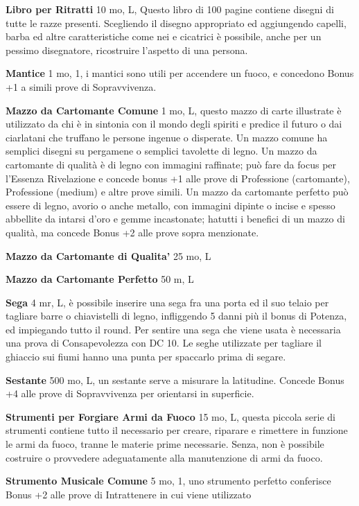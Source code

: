 \documentclass[a4paper,11pt,twoside,openany]{book}
\begin{document}
\textbf{Libro per Ritratti} 10 mo, L,  Questo libro di 100 pagine contiene disegni di tutte le razze presenti. Scegliendo il disegno appropriato ed aggiungendo capelli, barba ed altre caratteristiche come nei e cicatrici è possibile, anche per un pessimo disegnatore, ricostruire l'aspetto di una persona.

\textbf{Mantice} 1 mo, 1, i mantici sono utili per accendere un fuoco, e concedono Bonus +1 a simili prove di Sopravvivenza.

\textbf{Mazzo da Cartomante Comune} 1 mo, L, questo mazzo di carte illustrate è utilizzato da chi è in sintonia con il mondo degli spiriti e predice il futuro o dai ciarlatani che truffano le persone ingenue o disperate. Un mazzo comune ha semplici disegni su pergamene o semplici tavolette di legno.
Un mazzo da cartomante di qualità è di legno con immagini raffinate; può fare da focus per l'Essenza Rivelazione e concede bonus +1 alle prove di Professione (cartomante), Professione (medium) e altre prove simili.
Un mazzo da cartomante perfetto può essere di legno, avorio o anche metallo, con immagini dipinte o incise e spesso abbellite da intarsi d'oro e gemme incastonate; hatutti i benefici di un mazzo di qualità, ma concede Bonus +2 alle prove sopra menzionate.

\textbf{Mazzo da Cartomante di Qualita'} 25 mo, L

\textbf{Mazzo da Cartomante Perfetto} 50 m, L

\textbf{Sega} 4 mr, L, è possibile inserire una sega fra una porta ed il suo telaio per tagliare barre o chiavistelli di legno, infliggendo 5 danni più il bonus di Potenza, ed impiegando tutto il round.
Per sentire una sega che viene usata è necessaria una prova di Consapevolezza con DC 10. Le seghe utilizzate per tagliare il ghiaccio sui fiumi hanno una punta per spaccarlo prima di segare.

\textbf{Sestante} 500 mo, L, un sestante serve a misurare la latitudine. Concede Bonus +4 alle prove di Sopravvivenza per orientarsi in superficie.

\textbf{Strumenti per Forgiare Armi da Fuoco} 15 mo, L, questa piccola serie di strumenti contiene tutto il necessario per creare, riparare e rimettere in funzione le armi da fuoco, tranne le materie prime necessarie. Senza, non è possibile costruire o provvedere adeguatamente alla manutenzione di armi da fuoco.

\textbf{Strumento Musicale Comune} 5 mo, 1, uno strumento perfetto conferisce Bonus +2 alle prove di Intrattenere in cui viene utilizzato
\end{document}
